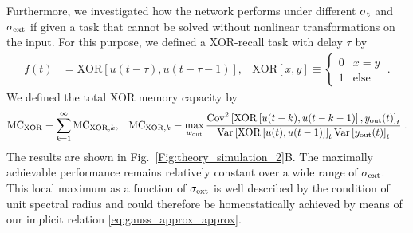 \documentclass[a4paper,12pt]{article}
\begin{document}
Furthermore, we investigated how the network performs under different $\sigma_{\rm t}$ and $\sigma_{\rm ext}$ if given a task that cannot be solved without nonlinear transformations on the input. For this purpose, we defined a XOR-recall task with delay $\tau$ by
\vspace*{-9pt}
\begin{align}
f(t) &= \mathrm{XOR}\left[u(t-\tau),u(t-\tau-1)\right], & \mathrm{XOR}\left[x,y\right] \equiv \begin{cases}
0 & x=y\\
1 & \text{else}
\end{cases} \; .
\end{align}
\vspace*{-7pt}
We defined the total XOR memory capacity by
\vspace*{-1pt}
\begin{align}
\mathrm{MC}_{\rm XOR} &\equiv \sum_{k=1}^\infty \mathrm{MC}_{{\rm XOR},k} , &
\mathrm{MC}_{{\rm XOR},k} \equiv \max\limits_{w_{\rm out}} \frac{\mathrm{Cov}^2\left[\mathrm{XOR}\left[u(t-k),u(t-k-1)\right],y_{\rm out}(t)\right]_t}{\mathrm{Var}\left[\mathrm{XOR}\left[u(t),u(t-1)\right]\right]_t \mathrm{Var}\left[y_{\rm out}(t)\right]_t} \; .\label{eq:MC_XOR}
\end{align}
The results are shown in Fig.~\ref{Fig:theory_simulation_2}B. The maximally achievable performance remains relatively constant over a wide range of $\sigma_{\rm ext}$. This local maximum as a function of $\sigma_{\rm ext}$ is well described by the condition of unit spectral radius and could therefore be homeostatically achieved by means of our implicit relation \eqref{eq:gauss_approx_approx}.
\end{document}

